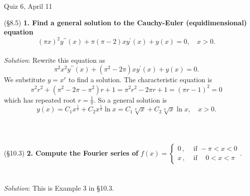 \documentclass[12pt]{article}
\begin{document}
\begin{center}
{\Large Quiz 6, April 11}
\end{center}
(\S 8.5) \textbf{1. Find a general solution to the Cauchy-Euler (equidimensional) equation}
$$(\pi x)^2 y^{\prime\prime} (x) + \pi(\pi-2)xy^\prime (x) + y(x) = 0, \quad x > 0.$$
~\\
\emph{Solution}: 
Rewrite this equation as
$$\pi^2 x^2 y^{\prime\prime} (x) + (\pi^2 - 2\pi)xy^\prime (x) + y(x) = 0.$$
We substitute $y = x^r$ to find a solution.  The characteristic equation is
$$\pi^2 r^2 + (\pi^2 - 2\pi - \pi^2) r + 1 = \pi^2 r^2 - 2 \pi r + 1 = (\pi r - 1)^2 = 0$$
which has repeated root $r = \frac{1}{\pi}$.  So a general solution is
$$y(x) = C_1 x^\frac{1}{\pi} + C_2 x^\frac{1}{\pi} \ln x = C_1 \sqrt[\pi]{x} + C_2 \sqrt[\pi]{x} \ln x, \quad x > 0.$$  
~\\~\\~\\
(\S 10.3) \textbf{2. Compute the Fourier series of} $f(x) = \begin{cases} 0\, , & \text{ if } -\pi < x < 0 \\ x\, , & \text{ if } \ \ \ \: 0 < x < \pi \end{cases}$. \\
~\\~\\
\emph{Solution}: This is Example 3 in \S 10.3.
\end{document}
